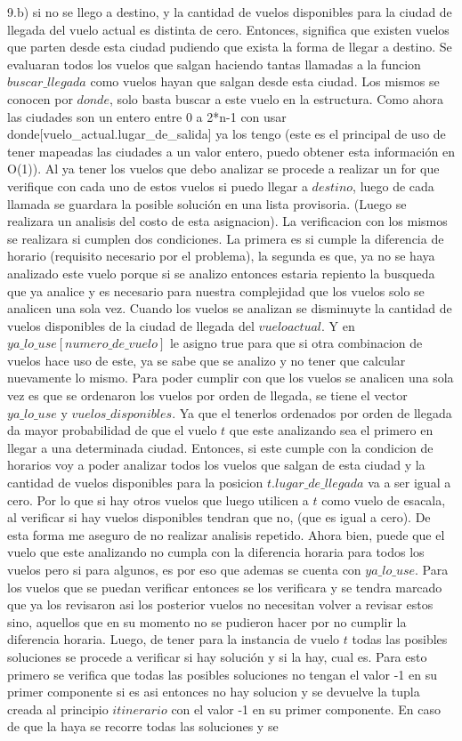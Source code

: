 \documentclass[a4paper]{article}
\begin{document}
9.b) si no se llego a destino, y la cantidad de vuelos disponibles para la ciudad de llegada del vuelo actual es distinta de cero. Entonces, significa que existen vuelos que parten desde esta ciudad pudiendo que exista la forma de llegar a destino. Se evaluaran todos los vuelos que salgan haciendo tantas llamadas a la funcion $buscar\_llegada$ como vuelos hayan que salgan desde esta ciudad. Los mismos se conocen por $donde$, solo basta buscar a este vuelo en la estructura. Como ahora las ciudades son un entero entre 0 a 2*n-1 con usar donde[vuelo\_actual.lugar\_de\_salida] ya los tengo (este es el principal de uso de tener mapeadas las ciudades a un valor entero, puedo obtener esta información en O(1)). Al ya tener los vuelos que debo analizar se procede a realizar un for que verifique con cada uno de estos vuelos si puedo llegar a $destino$, luego de cada llamada se guardara la posible solución en una lista provisoria. (Luego se realizara un analisis del costo de esta asignacion). La verificacion con los mismos se realizara si cumplen dos condiciones. La primera es si cumple la diferencia de horario (requisito necesario por el problema), la segunda es que, ya no se haya analizado este vuelo porque si se analizo entonces estaria repiento la busqueda que ya analice y es necesario para nuestra complejidad que los vuelos solo se analicen una sola vez. Cuando los vuelos se analizan se disminuyte la cantidad de vuelos disponibles de la ciudad de llegada del $vuelo actual$. Y  en$ya\_lo\_use[numero\_de\_vuelo]$ le asigno true para que si otra combinacion de vuelos hace uso de este, ya se sabe que se analizo y no tener que calcular nuevamente lo mismo. Para poder cumplir con que los vuelos se analicen una sola vez  es que se ordenaron los vuelos por orden de llegada, se tiene el vector $ya\_lo\_use$ y $vuelos\_disponibles$. Ya que el tenerlos ordenados por orden de llegada da mayor probabilidad de que el vuelo $t$ que este analizando sea el primero en llegar a una determinada ciudad. Entonces, si este cumple con la condicion de horarios voy a poder analizar todos los vuelos que salgan de esta ciudad y la cantidad de vuelos disponibles para la posicion $t.lugar\_de\_llegada$ va a ser igual a cero. Por lo que si hay otros vuelos que luego utilicen a $t$ como vuelo de esacala, al verificar si hay vuelos disponibles tendran que no, (que es igual a cero). De esta forma me aseguro de no realizar analisis repetido. Ahora bien, puede que el vuelo que este analizando no cumpla con la diferencia horaria para todos los vuelos pero si para algunos, es por eso que ademas se cuenta con $ya\_lo\_use$. Para los vuelos que se puedan verificar entonces se los verificara y se tendra marcado que ya los revisaron asi los posterior vuelos no necesitan volver a revisar estos sino, aquellos que en su momento no se pudieron hacer por no cumplir la diferencia horaria.  Luego, de tener para la instancia de vuelo $t$ todas las posibles soluciones se procede a verificar si hay solución y si la hay, cual es. Para esto primero se verifica que todas las posibles soluciones no tengan el valor -1 en su primer componente si es asi entonces no hay solucion y se devuelve la tupla creada al principio $itinerario$ con el valor -1 en su primer componente. En caso de que la haya se recorre todas las soluciones y se 
\end{document}
